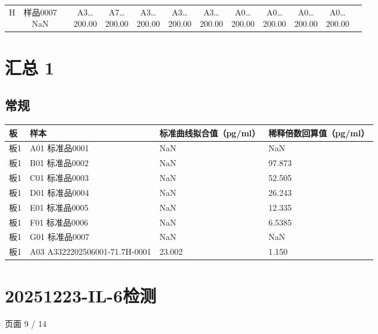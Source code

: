 \documentclass[UTF8,10pt,a4paper,fontset=fandol]{ctexart}
\begin{document}
\begin{center}
\begin{tabular}{c|cccccccccccc}
H & \shortstack{样品0007\\NaN} & & \shortstack{A3\ldots\\200.00} & \shortstack{A7\ldots\\200.00} & \shortstack{A3\ldots\\200.00} & \shortstack{A3\ldots\\200.00} & \shortstack{A3\ldots\\200.00} & \shortstack{A0\ldots\\200.00} & \shortstack{A0\ldots\\200.00} & \shortstack{A0\ldots\\200.00} & \shortstack{A0\ldots\\200.00} &\\
\end{tabular}
\end{center}


\section*{汇总 1}

\subsection*{常规}

\begin{center}
\begin{tabular}{llll}
板 & 样本 & 标准曲线拟合值（pg/ml） & 稀释倍数回算值（pg/ml）\\
\hline
板1 & A01 标准品0001 & NaN & NaN\\
板1 & B01 标准品0002 & NaN & 97.873\\
板1 & C01 标准品0003 & NaN & 52.505\\
板1 & D01 标准品0004 & NaN & 26.243\\
板1 & E01 标准品0005 & NaN & 12.335\\
板1 & F01 标准品0006 & NaN & 6.5385\\
板1 & G01 标准品0007 & NaN & NaN\\
板1 & A03 A3322202506001-71.7H-0001 & 23.002 & 1.150\\
\end{tabular}
\end{center}

\newpage

\section*{20251223-IL-6检测}
\hfill 页面 9 / 14
\end{document}
